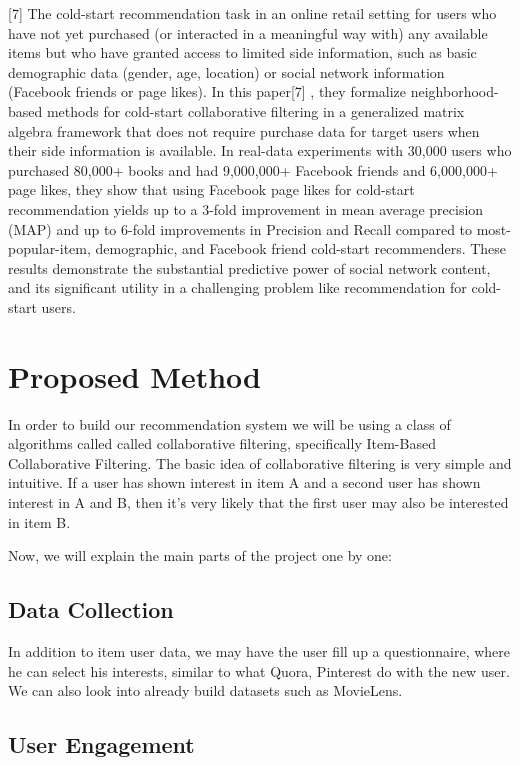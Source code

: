 \documentclass[12pt]{article} %
\begin{document}
[7] The cold-start recommendation task in an online retail setting for users who have not yet purchased (or interacted in a meaningful way with) any available items but who have granted access to limited side information, such as basic demographic data (gender, age, location) or social network information (Facebook friends or page likes). In this paper[7] ,  they formalize neighborhood-based methods for cold-start collaborative filtering in a generalized matrix algebra framework that does not require purchase data for target users when their side information is available. In real-data experiments with 30,000 users who purchased 80,000+ books and had 9,000,000+ Facebook friends and 6,000,000+ page likes, they show that using Facebook page likes for cold-start recommendation yields up to a 3-fold improvement in mean average precision (MAP) and up to 6-fold improvements in Precision and Recall compared to most-popular-item, demographic, and Facebook friend cold-start recommenders. These results demonstrate the substantial predictive power of social network content, and its significant utility in a challenging problem like recommendation for cold-start users.


\section{Proposed Method}

In order to build our recommendation system we will be using a class of algorithms called called collaborative filtering, specifically Item-Based Collaborative Filtering. The basic idea of collaborative filtering is very simple and intuitive. If a user has shown interest in item A and a second user has shown interest in A and B, then it's very likely that the first user may also be interested in item B. 

Now, we will explain the main parts of the project one by one:

\subsection{Data Collection}

In addition to item user data, we may have the user fill up a questionnaire, where he can select his interests, similar to what Quora, Pinterest do with the new user. We can also look into already build datasets such as MovieLens.

\subsection{User Engagement}
\end{document}
